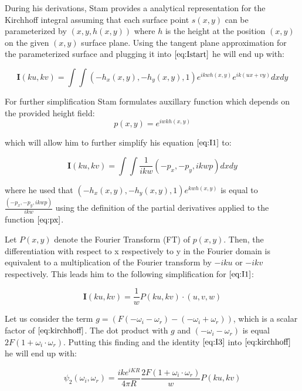 During his derivations, Stam provides a analytical representation for the Kirchhoff integral assuming that each surface point $s(x,y)$ can be parameterized by $(x,y,h(x,y))$ where $h$ is the height at the position $(x,y)$ on the given $(x,y)$ surface plane. Using the tangent plane approximation for the parameterized surface and plugging it into $\ref{eq:Istart}$ he will end up with: 

\begin{equation}
    \mathbf{I}(ku, kv) = \int \int (-h_{x}(x,y), -h_{y}(x,y), 1) e^{ikwh(x,y)} e^{ik(ux + vy)} dx dy
\label{eq:I1}
\end{equation}

For further simplification Stam formulates auxillary function which depends on the provided height field: 
\begin{equation}
  p(x,y) = e^{iwkh(x,y)} 
\label{eq:px}
\end{equation}

which will allow him to further simplify his equation $\ref{eq:I1}$ to:

\begin{equation}
    \mathbf{I}(ku, kv) = \int \int \frac{1}{ikw}(-p_x, -p_y, ikwp) dx dy
\label{eq:I2}
\end{equation}

where he used that $(-h_{x}(x,y), -h_{y}(x,y), 1)e^{kwh(x,y)}$ is equal to $\frac{(-p_x, -p_y, ikwp)}{ikw}$ using the definition of the partial derivatives applied to the function $\ref{eq:px}$.

Let $P(x,y)$ denote the Fourier Transform (FT) of $p(x,y)$. Then, the differentiation with respect to x respectively to y in the Fourier domain is equivalent to a multiplication of the Fourier transform by $-iku$ or $-ikv$ respectively. This leads him to the following simplification for $\ref{eq:I1}$:

\begin{equation}
    \mathbf{I}(ku, kv) = \frac{1}{w}P(ku, kv) \cdot (u,v,w)
\label{eq:I3}
\end{equation}

Let us consider the term $g = (F(-\omega_i - \omega_r)-(-\omega_i + \omega_r))$, which is a scalar factor of $\ref{eq:kirchhoff}$. The dot product with $g$ and $(-\omega_i - \omega_r)$ is equal $2F(1 + \omega_i \cdot \omega_r)$. Putting this finding and the identity $\ref{eq:I3}$ into $\ref{eq:kirchhoff}$ he will end up with:

\begin{equation}
\psi_{2}(\omega_i, \omega_r) = \frac{i k e^{i K R}}{4 \pi R} \frac{2F(1 + \omega_i \cdot \omega_r)}{w} P(ku, kv)
\label{eq:kirchhoffFinding}
\end{equation}

